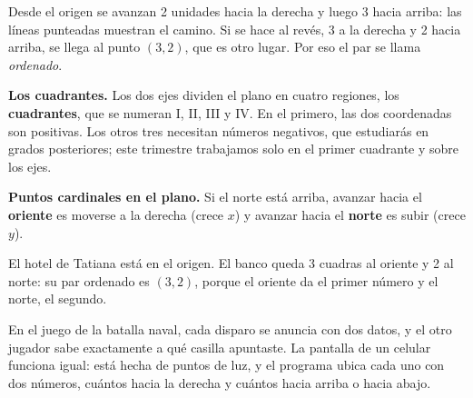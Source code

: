 \documentclass[11pt]{article}
\begin{document}
\begin{ejemplo}
Desde el origen se avanzan 2 unidades hacia la derecha y luego 3 hacia arriba: las líneas
punteadas muestran el camino. Si se hace al revés, 3 a la derecha y 2 hacia arriba, se llega al
punto $(3, 2)$, que es otro lugar. Por eso el par se llama \emph{ordenado}.
\end{ejemplo}

\textbf{Los cuadrantes.} Los dos ejes dividen el plano en cuatro regiones, los
\textbf{cuadrantes}, que se numeran I, II, III y IV. En el primero, las dos coordenadas son
positivas. Los otros tres necesitan números negativos, que estudiarás en grados posteriores;
este trimestre trabajamos solo en el primer cuadrante y sobre los ejes.

\textbf{Puntos cardinales en el plano.} Si el norte está arriba, avanzar hacia el
\textbf{oriente} es moverse a la derecha (crece $x$) y avanzar hacia el \textbf{norte} es
subir (crece $y$).

\begin{ejemplo}
El hotel de Tatiana está en el origen. El banco queda 3 cuadras al oriente y 2 al norte: su par
ordenado es $(3, 2)$, porque el oriente da el primer número y el norte, el segundo.
\end{ejemplo}

\begin{aplicacion}
En el juego de la batalla naval, cada disparo se anuncia con dos datos, y el otro jugador sabe
exactamente a qué casilla apuntaste. La pantalla de un celular funciona igual: está hecha de
puntos de luz, y el programa ubica cada uno con dos números, cuántos hacia la derecha y cuántos
hacia arriba o hacia abajo.
\end{aplicacion}
\end{document}

